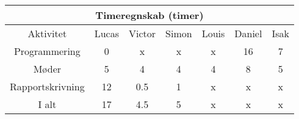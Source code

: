 \centering
\begin{tabular}{ |c|c|c|c|c|c|c|  }
 \hline
 \multicolumn{7}{|c|}{Timeregnskab (timer)} \\
 \hline
 Aktivitet & Lucas & Victor & Simon & Louis & Daniel & Isak\\
 \hline
 
 
 Programmering      & 0 & x & x & x & 16 & 7 \\
 
 Møder              & 5 & 4 & 4 & 4 & 8 & 5 \\
 
 Rapportskrivning   & 12 & 0.5 & 1 & x & x & x \\
 
 \hline
 
 I alt              & 17 & 4.5 & 5 & x & x & x \\
 
 
 \hline
\end{tabular}